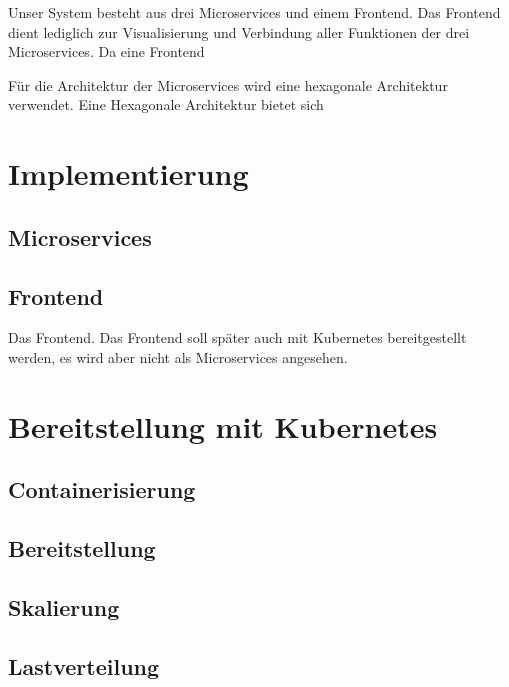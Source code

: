 Unser System besteht aus drei Microservices und einem Frontend. Das Frontend dient lediglich zur Visualisierung und Verbindung aller Funktionen der drei Microservices. Da eine Frontend 

Für die Architektur der Microservices wird eine hexagonale Architektur verwendet. Eine Hexagonale Architektur bietet sich 


\section{Implementierung}


\subsection{Microservices}

\subsection{Frontend}

Das Frontend. Das Frontend soll später auch mit Kubernetes bereitgestellt werden, es wird aber nicht als Microservices angesehen.

\section{Bereitstellung mit Kubernetes}

\subsection{Containerisierung}

\subsection{Bereitstellung}

\subsection{Skalierung}

\subsection{Lastverteilung}

